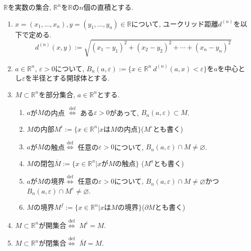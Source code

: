 \documentclass[dvipdfmx,a4paper,11pt]{article}
\newcommand{\R}{\mathbb{R}}
\theoremstyle{definition}
\begin{document}
\begin{tcolorbox}[
    colback = white,
    colframe = black!35!black,
    fonttitle = \bfseries,
    breakable = true]
$\R$を実数の集合, $\R^n$を$\R$の$n$個の直積とする. 
    \begin{enumerate}
    \setlength{\parskip}{0cm} 
  \setlength{\itemsep}{0cm} 
\item $x=(x_1, \ldots, x_n), y=(y_1, \ldots, y_n) \in \R$について, ユークリッド距離$d^{(n)}$を以下で定める. 
$$
d^{(n)}(x, y):= \sqrt{(x_1 - y_1)^2 + (x_2 - y_2)^2 + \cdots +(x_n - y_n)^2 }
$$
\item $a \in \R^n$, $\varepsilon >0$について, $B_{n}(a, \varepsilon):= \{ x \in \R^n \ d^{(n)}(a, x) < \varepsilon\}$を$a$を中心とし$\varepsilon$を半径とする開球体とする.
\item $M \subset \R^n$を部分集合, $a \in \R^n$とする.
    \begin{enumerate}[label=(\arabic*).]
    \setlength{\parskip}{0cm} 
  \setlength{\itemsep}{0cm} 
  \item $a$が$M$の内点 $\stackrel{\mathrm{def}}{\Longleftrightarrow}$ ある$\varepsilon >0$があって, $B_{n}(a, \varepsilon)\subset M$.
  \item $M$の内部$M^i := \{ x \in \R^n| \text{$x$は$M$の内点}\}$($M^{\circ}$とも書く)
  \item $a$が$M$の触点$\stackrel{\mathrm{def}}{\Longleftrightarrow}$ 任意の$\varepsilon >0$について, $B_{n}(a, \varepsilon) \cap M \neq \varnothing$.
    \item $M$の閉包$\overline{M} := \{ x \in \R^n| \text{$x$が$M$の触点}\}$ ($M^a$とも書く)
   \item $a$が$M$の境界$\stackrel{\mathrm{def}}{\Longleftrightarrow}$ 任意の$\varepsilon >0$について, $B_{n}(a, \varepsilon) \cap M \neq \varnothing$かつ$B_{n}(a, \varepsilon) \cap M^c \neq \varnothing$.
    \item $M$の境界$M^f := \{ x \in \R^n| \text{$x$は$M$の境界}\}$($\partial M$とも書く)
  \end{enumerate}
  \item $M \subset \R^n$が開集合$\stackrel{\mathrm{def}}{\Longleftrightarrow}$ $M^i =M$.
  \item $M \subset \R^n$が閉集合$\stackrel{\mathrm{def}}{\Longleftrightarrow}$ $\overline{M} =M$.
   \end{enumerate}
 \end{tcolorbox}
 
\end{document}
